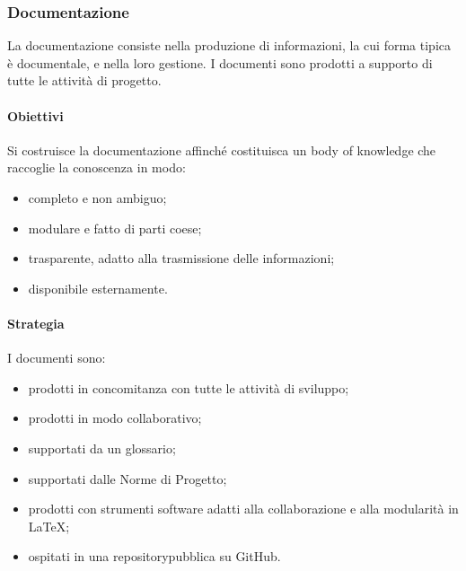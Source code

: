 	\subsubsection{Documentazione}
	La documentazione consiste nella produzione di informazioni, la cui forma tipica è documentale, e nella loro gestione. I documenti sono prodotti a supporto di tutte le attività di progetto.
		\paragraph{Obiettivi}
			Si costruisce la documentazione affinché costituisca un body of knowledge\glosp %
			che raccoglie la conoscenza in modo:
			\begin{itemize}
				\item completo e non ambiguo;
				\item modulare e fatto di parti coese;
				\item trasparente, adatto alla trasmissione delle informazioni;
				\item disponibile esternamente.
			\end{itemize}
		\paragraph{Strategia}
		I documenti sono:
		\begin{itemize}
			\item prodotti in concomitanza con tutte le attività di sviluppo;
			\item prodotti in modo collaborativo;
			\item supportati da un glossario;
			\item supportati dalle Norme di Progetto;
			\item prodotti con strumenti software adatti alla collaborazione e alla modularità in \LaTeX{};
			\item ospitati in una repository\glosp pubblica su GitHub.
		\end{itemize}
